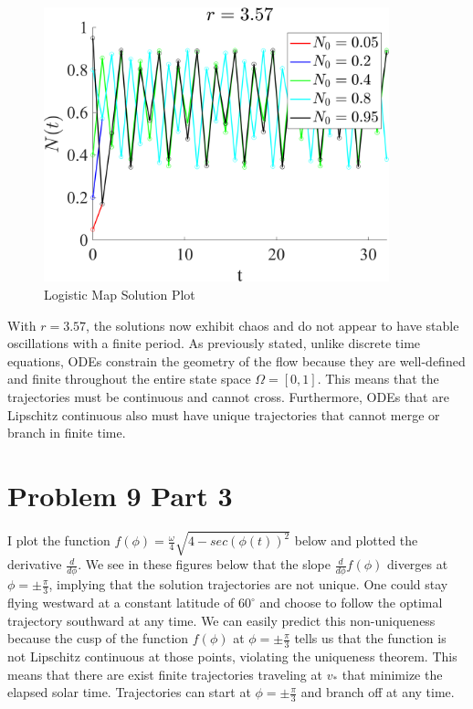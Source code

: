 \documentclass[11pt]{article}
\begin{document}
\begin{figure}[H]
\centering
\includegraphics[width=10cm]{Logistic_map_r_3_57}
\caption{Logistic Map Solution Plot}
\end{figure}

With $r = 3.57$, the solutions now exhibit chaos and do not appear to have stable oscillations with a finite period. As previously stated, unlike discrete time equations, ODEs constrain the geometry of the flow because they are well-defined and finite throughout the entire state space $\Omega = [0,1]$. This means that the trajectories must be continuous and cannot cross. Furthermore, ODEs that are Lipschitz continuous also must have unique trajectories that cannot merge or branch in finite time.

\section*{Problem 9 Part 3}
I plot the function $f(\phi) = \frac{\omega}{4} \sqrt{4- sec(\phi(t))^2}$ below and plotted the derivative $\frac{d}{d\phi}$. We see in these figures below that the slope $\frac{d}{d\phi} f(\phi)$ diverges at  $\phi = \pm \frac{\pi}{3}$, implying that the solution trajectories are not unique. One could stay flying westward at a constant latitude of $60^{\circ}$ and choose to follow the optimal trajectory southward at any time. We can easily predict this non-uniqueness because the cusp of the function $f(\phi)$ at $\phi = \pm \frac{\pi}{3}$ tells us that the function is not Lipschitz continuous at those points, violating the uniqueness theorem. This means that there are exist finite trajectories traveling at $v_*$ that minimize the elapsed solar time. Trajectories can start at $\phi = \pm \frac{\pi}{3}$ and branch off at any time.
\end{document}
